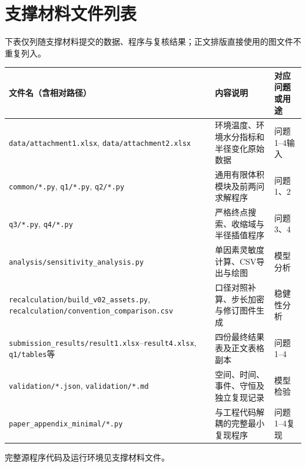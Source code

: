 \documentclass[UTF8,a4paper,zihao=-4,fontset=fandol]{ctexart}
\begin{document}
\section{支撑材料文件列表}
\label{app:files}
下表仅列随支撑材料提交的数据、程序与复核结果；正文排版直接使用的图文件不重复列入。
\begin{center}
\scriptsize
\renewcommand{\arraystretch}{1.08}
\begin{tabularx}{\textwidth}{l >{\raggedright\arraybackslash}X >{\raggedright\arraybackslash}X}
\toprule
文件名（含相对路径） & 内容说明 & 对应问题或用途 \\
\midrule
\nolinkurl{data/attachment1.xlsx}, \nolinkurl{data/attachment2.xlsx} & 环境温度、环境水分指标和半径变化原始数据 & 问题1--4输入\\
\nolinkurl{common/*.py}, \nolinkurl{q1/*.py}, \nolinkurl{q2/*.py} & 通用有限体积模块及前两问求解程序 & 问题1、2\\
\nolinkurl{q3/*.py}, \nolinkurl{q4/*.py} & 严格终点搜索、收缩域与半径插值程序 & 问题3、4\\
\nolinkurl{analysis/sensitivity_analysis.py} & 单因素灵敏度计算、CSV导出与绘图 & 模型分析\\
\nolinkurl{recalculation/build_v02_assets.py}, \nolinkurl{recalculation/convention_comparison.csv} & 口径对照补算、步长加密与修订图件生成 & 稳健性分析\\
\nolinkurl{submission_results/result1.xlsx}--\nolinkurl{result4.xlsx}, \nolinkurl{q1/tables}等 & 四份最终结果表及正文表格副本 & 问题1--4\\
\nolinkurl{validation/*.json}, \nolinkurl{validation/*.md} & 空间、时间、事件、守恒及独立复现记录 & 模型检验\\
\nolinkurl{paper_appendix_minimal/*.py} & 与工程代码解耦的完整最小复现程序 & 问题1--4复现\\
\bottomrule
\end{tabularx}
\end{center}

完整源程序代码及运行环境见支撑材料文件。
\end{document}

